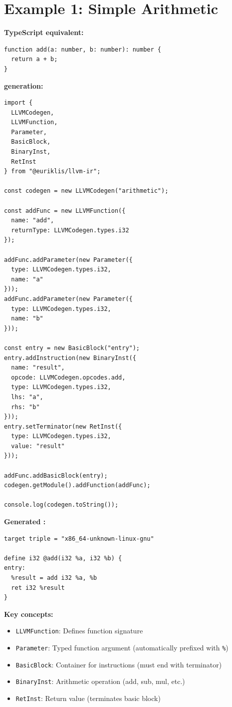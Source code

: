 \section{Example 1: Simple Arithmetic}

\textbf{TypeScript equivalent:}
\begin{lstlisting}[style=ts]
function add(a: number, b: number): number {
  return a + b;
}
\end{lstlisting}

\textbf{  generation:}
\begin{lstlisting}[style=ts]
import {
  LLVMCodegen,
  LLVMFunction,
  Parameter,
  BasicBlock,
  BinaryInst,
  RetInst
} from "@euriklis/llvm-ir";

const codegen = new LLVMCodegen("arithmetic");

const addFunc = new LLVMFunction({
  name: "add",
  returnType: LLVMCodegen.types.i32
});

addFunc.addParameter(new Parameter({
  type: LLVMCodegen.types.i32,
  name: "a"
}));
addFunc.addParameter(new Parameter({
  type: LLVMCodegen.types.i32,
  name: "b"
}));

const entry = new BasicBlock("entry");
entry.addInstruction(new BinaryInst({
  name: "result",
  opcode: LLVMCodegen.opcodes.add,
  type: LLVMCodegen.types.i32,
  lhs: "a",
  rhs: "b"
}));
entry.setTerminator(new RetInst({
  type: LLVMCodegen.types.i32,
  value: "result"
}));

addFunc.addBasicBlock(entry);
codegen.getModule().addFunction(addFunc);

console.log(codegen.toString());
\end{lstlisting}

\textbf{Generated  :}
\begin{lstlisting}[style=ir]
target triple = "x86_64-unknown-linux-gnu"

define i32 @add(i32 %a, i32 %b) {
entry:
  %result = add i32 %a, %b
  ret i32 %result
}
\end{lstlisting}

\textbf{Key concepts:}
\begin{itemize}[noitemsep]
  \item \texttt{LLVMFunction}: Defines function signature
  \item \texttt{Parameter}: Typed function argument (automatically prefixed with \texttt{\%})
  \item \texttt{BasicBlock}: Container for instructions (must end with terminator)
  \item \texttt{BinaryInst}: Arithmetic operation (add, sub, mul, etc.)
  \item \texttt{RetInst}: Return value (terminates basic block)
\end{itemize}

